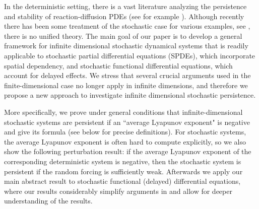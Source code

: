 \documentclass[final]{amsart}
\numberwithin{thm}{section}
\numberwithin{equation}{section}
\begin{document}
 In the deterministic setting, there is a vast literature analyzing the persistence and stability of reaction-diffusion PDEs (see for example \cite{carrying-capacity, allee-effect, deterministic-two-species, biology-waves, reac-diff-thesis, reac-diff-thesis-2, pattern-formation-deterministic-computational, deterministic-lotka-volterra}). Although  recently there has been some treatment of the stochastic case for various examples, see \cite{space-time, stochastic-SIR-analytical, traveling-waves-mult-noise, mult-noise, stochastic-SIR-NN, stochastic-SEIRS, stochastic-lotka-volterra-SPDE},  there is no unified theory. 
The main goal of our paper is to 
develop a general framework for infinite dimensional stochastic dynamical systems that is readily applicable to 
stochastic partial differential equations (SPDEs), which incorporate spatial dependency, and stochastic functional differential equations, which account for delayed effects. 
We stress that
 several crucial arguments used in the finite-dimensional case no longer apply in infinite dimensions, and therefore
 we propose a new approach to investigate infinite dimensional stochastic persistence. 
 



More specifically, we prove under general  conditions that infinite-dimensional stochastic systems are persistent if an  ``average Lyapunov exponent" is negative and give its formula
(see below for precise definitions).  For stochastic systems, the average Lyapunov exponent is often hard to compute explicitly, so we also show the following perturbation result: if the average Lyapunov exponent of the corresponding deterministic system is negative, then the stochastic system is persistent if the random forcing is sufficiently weak. 
Afterwards we apply our main abstract result to stochastic functional (delayed) differential equations, where our results considerably simplify arguments in \cite{functional} and allow for deeper understanding of the results.
\end{document}
